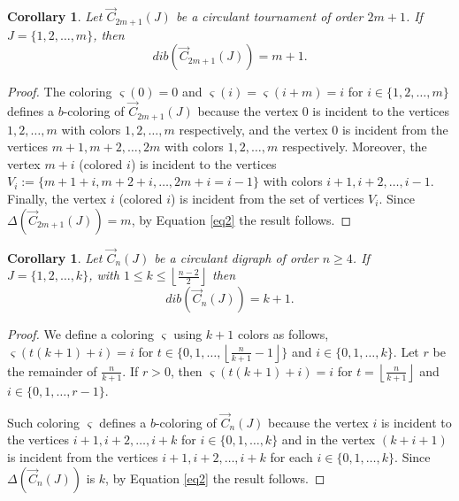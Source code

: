 \documentclass[12pt]{article}
\newtheorem{corollary}[theorem]{Corollary}
\begin{document}
\begin{corollary}\label{cor9}
Let $\overrightarrow{C}_{2m+1}(J)$ be a circulant tournament of order $2m+1$. If $J=\{1,2,\dots,m\}$, then \[dib(\overrightarrow{C}_{2m+1}(J))=m+1.\]
\end{corollary}
\begin{proof}
The coloring $\varsigma(0)=0$ and $\varsigma(i)=\varsigma(i+m)=i$ for $i\in \{1,2,\ldots,m\}$ defines a $b$-coloring of $\overrightarrow{C}_{2m+1}(J)$ because the vertex $0$ is incident to the vertices  $1,2,\ldots, m$ with colors $1,2,\ldots, m$ respectively, and the vertex $0$ is incident from the vertices  $m+1,m+2,\ldots, 2m$ with colors $1,2,\ldots, m$ respectively. Moreover, the vertex $m+i$ (colored $i$) is incident to the vertices $V_i:=\{m+1+i,m+2+i, \ldots, 2m+i=i-1\}$ with colors $i+1,i+2,\ldots, i-1$. Finally, the vertex $i$ (colored $i$) is incident from the set of vertices $V_i$.
Since $\Delta(\overrightarrow{C}_{2m+1}(J))=m$, by Equation \ref{eq2} the result follows.



\end{proof}

\begin{corollary}\label{cor10}
Let $\overrightarrow{C}_{n}(J)$ be a circulant digraph of order $n\geq 4$. If $J=\{1,2, \dots, k \}$, with $ 1\leq k \leq \left\lfloor \frac{n-2}{2}\right\rfloor$ then \[dib(\overrightarrow{C}_{n}(J))= k+1.\]
\end{corollary}
\begin{proof}
We define a coloring $\varsigma$ using $k+1$ colors as follows,  $\varsigma(t(k+1)+i)=i$ for $t\in \{0,1,\ldots, \left\lfloor \frac{n}{k+1}-1\right\rfloor\}$ and $i\in \{0,1,\ldots, k\}$. Let $r$ be the remainder of $\frac{n}{k+1}$. If $r>0$, then $\varsigma(t(k+1)+i)=i$ for $t=\left\lfloor \frac{n}{k+1}\right\rfloor$ and $i\in \{0,1,\ldots, r-1\}$.



Such coloring $\varsigma$ defines a $b$-coloring of $\overrightarrow{C}_{n}(J)$ because the vertex $i$ is incident to the vertices $i+1,i+2, \ldots, i+k$  for  $i\in \{0,1, \ldots, k\}$   and  in the vertex 
 $(k+i+1)$ is incident from the vertices  $i+1,i+2,\ldots, i+k$ for each $i\in \{0,1, \ldots, k\}$. Since $\Delta(\overrightarrow{C}_{n}(J))$ is $k$, by Equation \ref{eq2} the result follows.
 \end{proof}
\end{document}
